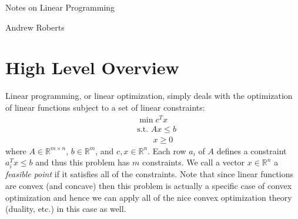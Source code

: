 \documentclass[12pt]{article}
\newcommand{\R}{\mathcal{R}}
\def\R{\mathbb{R}}
\begin{document}
\begin{center}
\Large
Notes on Linear Programming
\end{center}

\begin{flushright}
Andrew Roberts
\end{flushright} 

\section{High Level Overview}
Linear programming, or linear optimization, simply deals with the optimization of linear functions subject to a set of linear constraints: 
\begin{align*}
&\min c^T x \\
&\text{s.t. } Ax \leq b \\
&\;\;\;\;\;\;\; x \geq 0
\end{align*}
where $A \in \R^{m \times n}$, $b \in \R^m$, and $c, x \in \R^n$. Each row $a_i$ of $A$ defines a constraint $a_i^T x \leq b$ and thus this problem
has $m$ constraints. We call a vector $x \in \R^n$ a \textit{feasible point} if it satisfies all of the constraints. Note that since linear functions are convex
(and concave) then this problem is actually a specific case of convex optimization and hence we can apply all of the nice convex optimization theory
(duality, etc.) in this case as well. 
\end{document}
